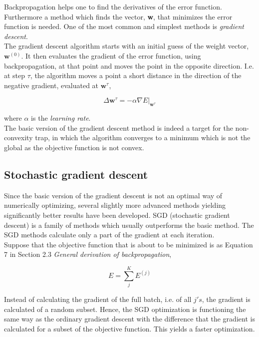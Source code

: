 \documentclass[11pt, letterpaper]{amsart}
\begin{document}
Backpropagation helps one to find the derivatives of the error function. Furthermore a method which finds the vector, \textbf{w}, that minimizes the error function is needed. One of the most common and simplest methods is \textit{gradient descent}.
\\

The gradient descent algorithm starts with an initial guess of the weight vector, $\textbf{w}^{(0)}$. It then evaluates the gradient of the error function, using backpropagation, at that point and moves the point in the opposite direction. I.e. at step $\tau$, the algorithm moves a point a short distance in the direction of the negative gradient, evaluated at $\textbf{w}^{\tau}$,

\begin{equation}
    \Delta \textbf{w}^{\tau} = - \alpha \nabla E \vert_{\textbf{w}^{\tau}}
\end{equation}

where $\alpha$ is the \textit{learning rate}.
\\

The basic version of the gradient descent method is indeed a target for the non-convexity trap, in which the algorithm converges to a minimum which is not the global as the objective function is not convex.

\subsection{Stochastic gradient descent}
Since the basic version of the gradient descent is not an optimal way of numerically optimizing, several slightly more advanced methods yielding significantly better results have been developed. SGD (stochastic gradient descent) is a family of methods which usually outperforms the basic method. The SGD methods calculate only a part of the gradient at each iteration.
\\

Suppose that the objective function that is about to be minimized is as Equation 7 in Section 2.3 \textit{General derivation of backpropagation},

\begin{equation}
    E = \sum_j^K E^{(j)}
\end{equation}

Instead of calculating the gradient of the full batch, i.e. of all $j's$, the gradient is calculated of a random subset. Hence, the SGD optimization is functioning the same way as the ordinary gradient descent with the difference that the gradient is calculated for a subset of the objective function. This yields a faster optimization.
\end{document}
